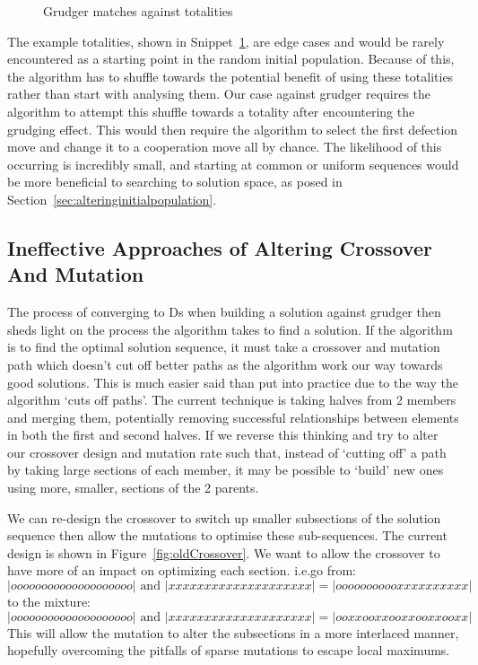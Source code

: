 \begin{figure}[h]
    \inputminted{python}{code_snippets/grudgerTotalities.py}
    \caption{Grudger matches against totalities}\label{code:gudgerTotalities}
\end{figure}

The example totalities, shown in Snippet~\ref{code:gudgerTotalities}, are edge cases and would be rarely encountered as a starting point in the random initial population.
Because of this, the algorithm has to shuffle towards the potential benefit of using these totalities rather than start with analysing them.
Our case against grudger requires the algorithm to attempt this shuffle towards a totality after encountering the grudging effect.
This would then require the algorithm to select the first defection move and change it to a cooperation move all by chance.
The likelihood of this occurring is incredibly small, and starting at common or uniform sequences would be more beneficial to searching to solution space, as posed in Section~\ref{sec:alteringinitialpopulation}.

\subsection{Ineffective Approaches of Altering Crossover And Mutation}\label{subsec:ineffectiveApproachOfAlteringCrossoverAndMutation}
The process of converging to Ds when building a solution against grudger then sheds light on the process the algorithm takes to find a solution.
If the algorithm is to find the optimal solution sequence, it must take a crossover and mutation path which doesn't cut off better paths as the algorithm work our way towards good solutions.
This is much easier said than put into practice due to the way the algorithm `cuts off paths'.
The current technique is taking halves from 2 members and merging them, potentially removing successful relationships between elements in both the first and second halves.
If we reverse this thinking and try to alter our crossover design and mutation rate such that, instead of `cutting off' a path by taking large sections of each member, it may be possible to `build' new ones using more, smaller, sections of the 2 parents.

We can re-design the crossover to switch up smaller subsections of the solution sequence then allow the mutations to optimise these sub-sequences.
The current design is shown in Figure~\ref{fig:oldCrossover}.
We want to allow the crossover to have more of an impact on optimizing each section. 
i.e.go from:
\[|oooooooooooooooooooo| \text{ and } |xxxxxxxxxxxxxxxxxxxx|= |ooooooooooxxxxxxxxxx|\]
to the mixture:
\[|oooooooooooooooooooo|\text{ and } |xxxxxxxxxxxxxxxxxxxx|= |ooxxooxxooxxooxxooxx|\]
This will allow the mutation to alter the subsections in a more interlaced manner, hopefully overcoming the pitfalls of sparse mutations to escape local maximums.


